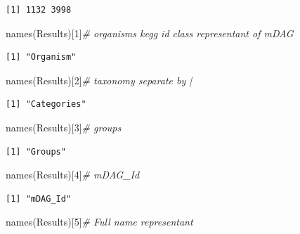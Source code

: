 \documentclass[
  letterpaper,
  DIV=11,
  numbers=noendperiod]{scrreprt}
\newenvironment{Shaded}{}{}
\newcommand{\CommentTok}[1]{\textcolor[rgb]{0.36,0.39,0.44}{\textit{#1}}}
\newcommand{\DecValTok}[1]{\textcolor[rgb]{0.82,0.60,0.40}{#1}}
\newcommand{\FunctionTok}[1]{\textcolor[rgb]{0.38,0.69,0.94}{#1}}
\newcommand{\NormalTok}[1]{\textcolor[rgb]{0.67,0.70,0.75}{#1}}
\begin{document}
\begin{verbatim}
[1] 1132 3998
\end{verbatim}

\begin{Shaded}
\begin{Highlighting}[]
\FunctionTok{names}\NormalTok{(Results)[}\DecValTok{1}\NormalTok{]}\CommentTok{\# organisms  kegg id  class representant of mDAG}
\end{Highlighting}
\end{Shaded}

\begin{verbatim}
[1] "Organism"
\end{verbatim}

\begin{Shaded}
\begin{Highlighting}[]
\FunctionTok{names}\NormalTok{(Results)[}\DecValTok{2}\NormalTok{]}\CommentTok{\# taxonomy separate by |}
\end{Highlighting}
\end{Shaded}

\begin{verbatim}
[1] "Categories"
\end{verbatim}

\begin{Shaded}
\begin{Highlighting}[]
\FunctionTok{names}\NormalTok{(Results)[}\DecValTok{3}\NormalTok{]}\CommentTok{\# groups }
\end{Highlighting}
\end{Shaded}

\begin{verbatim}
[1] "Groups"
\end{verbatim}

\begin{Shaded}
\begin{Highlighting}[]
\FunctionTok{names}\NormalTok{(Results)[}\DecValTok{4}\NormalTok{]}\CommentTok{\# mDAG\_Id }
\end{Highlighting}
\end{Shaded}

\begin{verbatim}
[1] "mDAG_Id"
\end{verbatim}

\begin{Shaded}
\begin{Highlighting}[]
\FunctionTok{names}\NormalTok{(Results)[}\DecValTok{5}\NormalTok{]}\CommentTok{\# Full name representant}
\end{Highlighting}
\end{Shaded}
\end{document}
